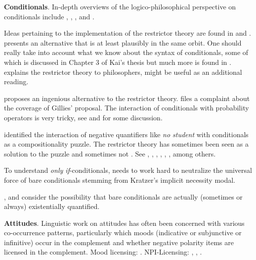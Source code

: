 \textbf{Conditionals}. In-depth overviews of the logico-philosophical
perspective on conditionals include \cite{nute-1984-conditional},
\cite{edgington-1995-conditionals}, \cite{bennett-2003-guide}, and
\cite{starr-2019-sep-counterfactuals}.

Ideas pertaining to the implementation of the restrictor theory are found in
\cite{reich-2009-asymmetric} and \cite{ebert-ebert-hinterwimmer-2014-unified}.
\cite{schlenker-2004-conditionals} presents an alternative that is at least
plausibly in the same orbit. One should really take into account what we know
about the syntax of conditionals, some of which is discussed in Chapter 3 of
Kai's thesis but much more is found in \cite{bhatt-pancheva-2006-conditionals}.
\cite{rothschild-2011-conditionals-restrictors} explains the restrictor theory
to philosophers, might be useful as an additional reading.

\cite{gillies-2010-iffiness} proposes an ingenious alternative to the restrictor
theory. \cite{khoo-2011-gillies} files a complaint about the coverage of
Gillies' proposal. The interaction of conditionals with probability operators is
very tricky, see \cite{egre-cozic-2011-if-prob} and
\cite{fintel-gillies-2015-hedging} for some discussion.

\cite{higginbotham-1986-davidson} identified the interaction of negative
quantifiers like \emph{no student} with conditionals as a compositionality
puzzle. The restrictor theory has sometimes been seen as a solution to the
puzzle \citep{fintel-1998-qandif} and sometimes not
\citep{fintel-iatridou-2002-ifwhen}. See \cite{dekker-2001-if-only},
\cite{higginbotham-2003-conditionals}, \cite{leslie-2009-unless},
\cite{huitink-2010-quantified-conditionals}, \cite{klinedinst-2011-qc-cem},
\cite{kratzer-2015-hook}, \cite{lauer-nadathur-2016-qic-most} among others.

To understand \emph{only if}-conditionals, \cite{fintel-1997-bare} needs to work
hard to neutralize the universal force of bare conditionals stemming from
Kratzer's implicit necessity modal.

\cite{herburger-2015-only-if,herburger-2016-perfection}, and
\cite{bassi-bar-lev-2017-unified-existential} consider the possibility that
bare conditionals are actually (sometimes or always) existentially quantified.

\textbf{Attitudes}. Linguistic work on attitudes has often been concerned with
various co-occurrence patterns, particularly which moods (indicative or
subjunctive or infinitive) occur in the complement and whether negative polarity
items are licensed in the complement. Mood licensing: \cite{portner-1997-mood}.
NPI-Licensing: \cite{kadmon-landman-1993-any}, \cite{fintel-1999-npi},
\cite{giannakidou-1999-affective}.

